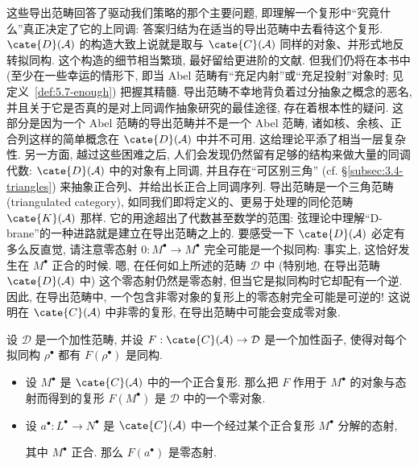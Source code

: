 这些导出范畴回答了驱动我们策略的那个主要问题, 即理解一个复形中``究竟什么''真正决定了它的上同调: 答案归结为在适当的导出范畴中去看待这个复形. $\cate{D}(\mathcal A)$ 的构造大致上说就是取与 $\cate{C}(\mathcal A)$ 同样的对象、并形式地反转拟同构. 这个构造的细节相当繁琐, 最好留给更进阶的文献. 但我们仍将在本书中 (至少在一些幸运的情形下, 即当 Abel 范畴有``充足内射''或``充足投射''对象时; 见定义~\ref{def:5.7-enough}) 把握其精髓.
导出范畴不幸地背负着过分抽象之概念的恶名, 并且关于它是否真的是对上同调作抽象研究的最佳途径, 存在着根本性的疑问. 这部分是因为一个 Abel 范畴的导出范畴并不是一个 Abel 范畴, 诸如核、余核、正合列这样的简单概念在 $\cate{D}(\mathcal A)$ 中并不可用. 这给理论平添了相当一层复杂性.
\indent 另一方面, 越过这些困难之后, 人们会发现仍然留有足够的结构来做大量的同调代数: $\cate{D}(\mathcal A)$ 中的对象有上同调, 并且存在``可区别三角'' (cf. \S\ref{subsec:3.4-triangles}) 来抽象正合列、并给出长正合上同调序列. 导出范畴是一个三角范畴 (triangulated category), 如同我们即将定义的、更易于处理的同伦范畴 $\cate{K}(\mathcal A)$ 那样. 它的用途超出了代数甚至数学的范围: 弦理论中理解``D-brane''的一种进路就是建立在导出范畴之上的.
要感受一下 $\cate{D}(\mathcal A)$ 必定有多么反直觉, 请注意零态射 $0:M^\bullet\to M^\bullet$ 完全可能是一个拟同构: 事实上, 这恰好发生在 $M^\bullet$ 正合的时候. 嗯, 在任何如上所述的范畴 $\mathcal D$ 中 (特别地, 在导出范畴 $\cate{D}(\mathcal A)$ 中) 这个零态射仍然是零态射, 但当它是拟同构时它却配有一个逆. 因此, 在导出范畴中, 一个包含非零对象的复形上的零态射完全可能是可逆的! 这说明在 $\cate{C}(\mathcal A)$ 中非零的复形, 在导出范畴中可能会变成零对象.

\begin{lemma}\label{lem:4.7-quasi-iso-functor-zero}
设 $\mathcal D$ 是一个加性范畴, 并设 $F:\cate{C}(\mathcal A)\to\mathcal D$ 是一个加性函子, 使得对每个拟同构 $\rho^\bullet$ 都有 $F(\rho^\bullet)$ 是同构.
\begin{itemize}
\item 设 $M^\bullet$ 是 $\cate{C}(\mathcal A)$ 中的一个正合复形. 那么把 $F$ 作用于 $M^\bullet$ 的对象与态射而得到的复形 $F(M^\bullet)$ 是 $\mathcal D$ 中的一个零对象.
\item 设 $a^\bullet:L^\bullet\to N^\bullet$ 是 $\cate{C}(\mathcal A)$ 中一个经过某个正合复形 $M^\bullet$ 分解的态射,
\begin{center}
\end{center}
其中 $M^\bullet$ 正合. 那么 $F(a^\bullet)$ 是零态射.
\end{itemize}
\end{lemma}

